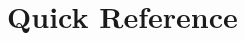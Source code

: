\documentclass{memoir}
\begin{document}
   \chapter{~Quick Reference~}~

 \textls{~}
\end{document}

